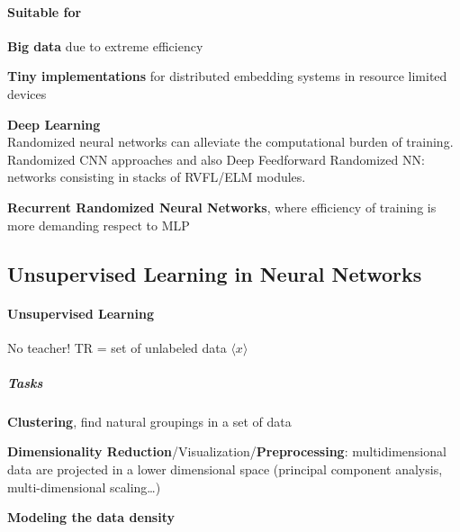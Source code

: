 \documentclass[10pt]{report}
\begin{document}
\paragraph{Suitable for}\begin{list}{}{}
	\item \textbf{Big data} due to extreme efficiency
	\item \textbf{Tiny implementations} for distributed embedding systems in resource limited devices
	\item \textbf{Deep Learning}\\
	Randomized neural networks can alleviate the computational burden of training. Randomized CNN approaches and also Deep Feedforward Randomized NN: networks consisting in stacks of RVFL/ELM modules.
	\item \textbf{Recurrent Randomized Neural Networks}, where efficiency of training is more demanding respect to MLP
\end{list}
\subsection{Unsupervised Learning in Neural Networks}
\paragraph{Unsupervised Learning} No teacher! TR = set of unlabeled data $\langle x\rangle$
\subparagraph{Tasks}\begin{list}{}{}
	\item \textbf{Clustering}, find natural groupings in a set of data
	\item \textbf{Dimensionality Reduction}/Visualization/\textbf{Preprocessing}: multidimensional data are projected in a lower dimensional space (principal component analysis, multi-dimensional scaling\ldots)
	\item \textbf{Modeling the data density}
\end{list}
\end{document}

